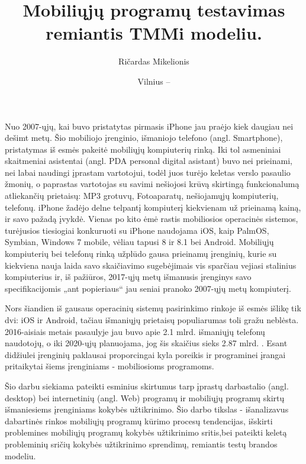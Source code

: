 \documentclass{VUMIFPSkursinis}
\title{Mobiliųjų programų testavimas remiantis TMMi modeliu.}
\author{Ričardas Mikelionis}
\date{Vilnius – \the\year}
\begin{document}
\maketitle

\cleardoublepage
{}
\tableofcontents
\cleardoublepage
{}

Nuo 2007-ųjų, kai buvo pristatytas pirmasis iPhone jau praėjo kiek daugiau nei dešimt metų. Šio mobiliojo įrenginio, išmaniojo telefono (angl. Smartphone), pristatymas  iš esmės pakeitė mobiliųjų kompiuterių rinką. Iki tol asmeniniai skaitmeniai asistentai (angl. PDA personal digital asistant) buvo nei prieinami, nei labai naudingi įprastam vartotojui, todėl juos turėjo keletas verslo pasaulio žmonių, o paprastas vartotojas su savimi nešiojosi krūvą skirtingą funkcionalumą atliekančių prietaisų: MP3 grotuvų, Fotoaparatų, nešiojamųjų kompiuterių, telefonų. iPhone žadėjo delne telpantį kompiuterį kiekvienam už prieinamą kainą, ir savo pažadą įvykdė. Vienas po kito ėmė rastis  mobiliosios operacinės sistemos, turėjusios tiesiogiai konkuruoti su iPhone naudojama iOS,  kaip PalmOS, Symbian, Windows 7 mobile, vėliau tapusi 8 ir 8.1 bei Android. Mobiliųjų kompiuterių bei telefonų rinką užplūdo gausa prieinamų įrenginių, kurie su kiekviena nauja laida savo skaičiavimo sugebėjimais vis sparčiau vejiasi stalinius kompiuterius ir, iš pažiūros, 2017-ųjų metų išmanusis įrenginys savo specifikacijomis „ant popieriaus“ jau seniai pranoko 2007-ųjų metų kompiuterį.

Nors šiandien iš gausaus operacinių sistemų pasirinkimo rinkoje iš esmės išlikę tik dvi: iOS ir Android, tačiau  išmaniųjų prietaisų populiarumas toli gražu neblėsta. 2016-aisiais metais pasaulyje jau buvo apie 2.1 mlrd. išmaniųjų telefonų naudotojų, o iki 2020-ųjų planuojama, jog šis skaičius sieks 2.87 mlrd. \cite{statista.com}. Esant didžiulei įrenginių paklausai proporcingai kyla poreikis ir programinei įrangai pritaikytai šiems įrenginiams - mobiliosioms programoms.

Šio darbu siekiama pateikti esminius skirtumus tarp įprastų darbastalio (angl. desktop) bei internetinių (angl. Web) programų ir mobiliųjų programų skirtų išmaniesiems įrenginiams kokybės užtikrinimo. Šio darbo tikslas - išanalizavus dabartinės rinkos mobiliųjų programų kūrimo procesų tendencijas, išskirti problemines mobiliųjų programų kokybės užtikrinimo sritis,bei pateikti keletą probleminių sričių kokybės užtikrinimo sprendimų, remiantis testų brandos modeliu.
\end{document}
